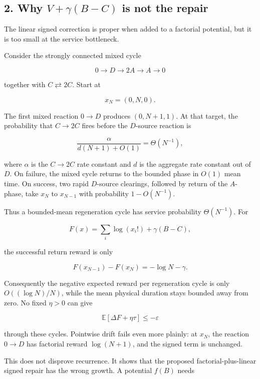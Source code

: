 \subsection{\texorpdfstring{2. Why \(V+\gamma(B-C)\) is not the
repair}{2. Why V+\textbackslash gamma(B-C) is not the repair}}

The linear signed correction is proper when added to a factorial
potential, but it is too small at the service bottleneck.

Consider the strongly connected mixed cycle

\[
 0\longrightarrow D\longrightarrow2A\longrightarrow A\longrightarrow0
\tag{2.1}
\]

together with \(C\rightleftarrows2C\). Start at

\[
 x_N=(0,N,0).
\tag{2.2}
\]

The first mixed reaction \(0\to D\) produces \((0,N+1,1)\). At that
target, the probability that \(C\to2C\) fires before the \(D\)-source
reaction is

\[
 \frac{\alpha}{d(N+1)+O(1)}=\Theta(N^{-1}),
\tag{2.3}
\]

where \(\alpha\) is the \(C\to2C\) rate constant and \(d\) is the
aggregate rate constant out of \(D\). On failure, the mixed cycle
returns to the bounded phase in \(O(1)\) mean time. On success, two
rapid \(D\)-source clearings, followed by return of the \(A\)-phase,
take \(x_N\) to \(x_{N-1}\) with probability \(1-O(N^{-1})\).

Thus a bounded-mean regeneration cycle has service probability
\(\Theta(N^{-1})\). For

\[
 F(x)=\sum_i\log(x_i!)+\gamma(B-C),
\tag{2.4}
\]

the successful return reward is only

\[
 F(x_{N-1})-F(x_N)=-\log N-\gamma.
\tag{2.5}
\]

Consequently the negative expected reward per regeneration cycle is only
\(O((\log N)/N)\), while the mean physical duration stays bounded away
from zero. No fixed \(\eta>0\) can give

\[
 \mathbb E[\Delta F+\eta\tau]\le-\varepsilon
\tag{2.6}
\]

through these cycles. Pointwise drift fails even more plainly: at
\(x_N\), the reaction \(0\to D\) has factorial reward \(\log(N+1)\), and
the signed term is unchanged.

This does not disprove recurrence. It shows that the proposed
factorial-plus-linear signed repair has the wrong growth. A potential
\(f(B)\) needs


